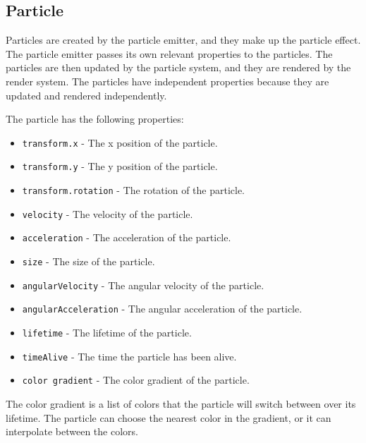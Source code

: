 \subsection{Particle}
Particles are created by the particle emitter, and they make up the particle effect.
The particle emitter passes its own relevant properties to the particles.
The particles are then updated by the particle system, and they are rendered by the render system.
The particles have independent properties because they are updated and rendered independently.

The particle has the following properties:
\begin{itemize}
    \item \texttt{transform.x} - The x position of the particle.
    \item \texttt{transform.y} - The y position of the particle.
    \item \texttt{transform.rotation} - The rotation of the particle.
    \item \texttt{velocity} - The velocity of the particle.
    \item \texttt{acceleration} - The acceleration of the particle.
    \item \texttt{size} - The size of the particle.
    \item \texttt{angularVelocity} - The angular velocity of the particle.
    \item \texttt{angularAcceleration} - The angular acceleration of the particle.
    \item \texttt{lifetime} - The lifetime of the particle.
    \item \texttt{timeAlive} - The time the particle has been alive.
    \item \texttt{color gradient} - The color gradient of the particle.
\end{itemize}

The color gradient is a list of colors that the particle will switch between over its lifetime.
The particle can choose the nearest color in the gradient, or it can interpolate between the colors.

